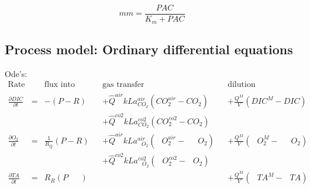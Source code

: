 \documentclass{ruthesis}
\begin{document}
\begin{equation}
mm = \frac{PAC}{K_m + PAC} 
\end{equation}

\subsection{Process model: Ordinary differential equations}

Ode's:
\begin{align}
\text{Rate} & & \text{flux into cells}            &            &\text{gas transfer}   &     & \text{dilution} \nonumber                              \\
\frac{\partial DIC}{\partial t}&=&                      - (P - R)&      &+\hat Q^{air}kLa_{ CO_2}^{air}(CO_{2}^{air} - CO_{2})                  & &+\frac{Q^M}{V}(DIC^{M} - DIC)       \nonumber \\
                                           &  &                                   &      &+\hat Q^{co2}kLa_{ CO_2}^{co2}(CO_{2}^{co2} - CO_{2})    \\
\frac{\partial O_2}{\partial t}&=& \frac{1}{R_Q}  (P - R)&      &+\hat Q^{air}kLa_{\phantom{C}O_2}^{air}(\phantom{C}O_{2}^{air} -   \phantom{CC}O_{2}) && +\frac{Q^M}{V}(\phantom{C}O_{2}^{M} - \phantom{CC}O_{2})     \nonumber   \\
                                           &  &                                   &      &+\hat Q^{co2}kLa_{\phantom{C}O_2}^{co2}(\phantom{C}O_{2}^{co2} - \phantom{C}O_{2})    \\
\frac{\partial TA}{\partial t} & =&      R_R (P \phantom{ + R})& & & & +\frac{Q^M}{V}(\phantom{C}TA^{M} - \phantom{C}TA)
\end{align}
\end{document}
